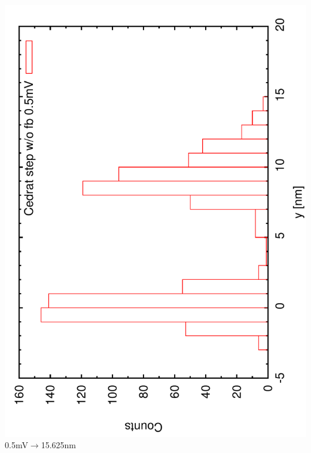 \documentclass[a4paper,11pt]{book}
\begin{document}
\includegraphics[angle=-90,scale=0.20]{imagestep31a.pdf}\\
{\scriptsize 0.5mV$\rightarrow$15.625nm}\\
\end{document}
